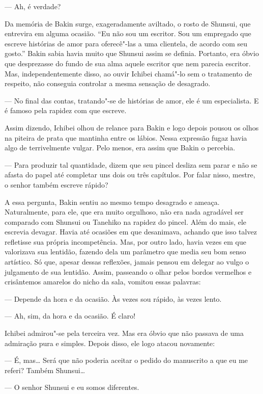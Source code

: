 --- Ah, é verdade?

Da memória de Bakin surge, exageradamente aviltado, o rosto de Shunsui,
que entrevira em alguma ocasião. ``Eu não sou um escritor. Sou um
empregado que escreve histórias de amor para oferecê"-las a uma
clientela, de acordo com seu gosto.'' Bakin sabia havia muito que
Shunsui assim se definia. Portanto, era óbvio que desprezasse do fundo
de sua alma aquele escritor que nem parecia escritor. Mas,
independentemente disso, ao ouvir Ichibei chamá"-lo sem o tratamento de
respeito, não conseguia controlar a mesma sensação de desagrado.

--- No final das contas, tratando"-se de histórias de amor, ele é um
especialista. E é famoso pela rapidez com que escreve.

Assim dizendo, Ichibei olhou de relance para Bakin e logo depois pousou
os olhos na piteira de prata que mantinha entre os lábios. Nessa
expressão fugaz havia algo de terrivelmente vulgar. Pelo menos, era
assim que Bakin o percebia.

--- Para produzir tal quantidade, dizem que seu pincel desliza sem parar e 
não se afasta do papel até completar uns dois ou três capítulos. Por
falar nisso, mestre, o senhor também escreve rápido?

A essa pergunta, Bakin sentiu ao mesmo tempo desagrado e ameaça.
Naturalmente, para ele, que era muito orgulhoso, não era nada agradável
ser comparado com Shunsui ou Tanehiko na rapidez do pincel. Além do
mais, ele escrevia devagar. Havia até ocasiões em que desanimava,
achando que isso talvez refletisse sua própria incompetência. Mas, por
outro lado, havia vezes em que valorizava sua lentidão, fazendo dela um
parâmetro que media seu bom senso artístico. Só que, apesar dessas
reflexões, jamais pensou em delegar ao vulgo o julgamento de sua
lentidão. Assim, passeando o olhar pelos bordos vermelhos e crisântemos
amarelos do nicho da sala, vomitou essas palavras:

--- Depende da hora e da ocasião. Às vezes sou rápido, às vezes lento. 

--- Ah, sim, da hora e da ocasião. É claro!

Ichibei admirou"-se pela terceira vez. Mas era óbvio que não passava de
uma admiração pura e simples. Depois disso, ele logo atacou novamente:

--- É, mas\ldots{} Será que não poderia aceitar o pedido do manuscrito a que eu
me referi? Também Shunsui\ldots{}

--- O senhor Shunsui e eu somos diferentes.

